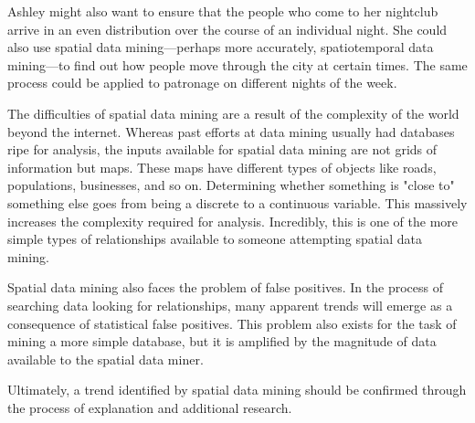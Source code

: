 Ashley might also want to ensure that the people who come to her nightclub arrive in an even distribution over the course of an individual night. She could also use spatial data mining—perhaps more accurately, spatiotemporal data mining—to find out how people move through the city at certain times. The same process could be applied to patronage on different nights of the week.

The difficulties of spatial data mining are a result of the complexity of the world beyond the internet. Whereas past efforts at data mining usually had databases ripe for analysis, the inputs available for spatial data mining are not grids of information but maps. These maps have different types of objects like roads, populations, businesses, and so on.
Determining whether something is "close to" something else goes from being a discrete to a continuous variable. This massively increases the complexity required for analysis. Incredibly, this is one of the more simple types of relationships available to someone attempting spatial data mining.

Spatial data mining also faces the problem of false positives. In the process of searching data looking for relationships, many apparent trends will emerge as a consequence of statistical false positives. This problem also exists for the task of mining a more simple database, but it is amplified by the magnitude of data available to the spatial data miner. 

Ultimately, a trend identified by spatial data mining should be confirmed through the process of explanation and additional research.

